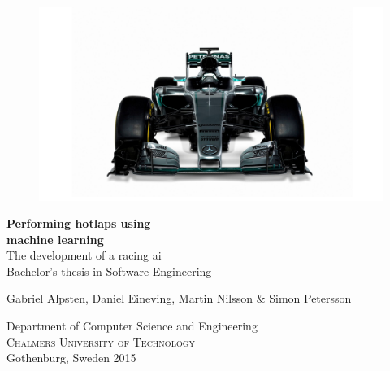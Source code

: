 \begin{titlepage}
			
\addtolength{\voffset}{2cm}

\begin{figure}[H]
\centering
\vspace{1cm}	%
\includegraphics[width=0.9\linewidth]{report/images/logo.jpg}
\end{figure}
\setlength{\parindent}{0ex}
\mbox{}
\vfill
\renewcommand{\familydefault}{\sfdefault} \normalfont %


\textbf{{\Huge Performing hotlaps using \\ machine learning}} 	\\[0.5cm]
{\Large The development of a racing ai}\\[0.5cm]
Bachelor's thesis in Software Engineering \setlength{\parskip}{1cm}

{\large Gabriel Alpsten, Daniel Eineving, Martin Nilsson \& Simon Petersson} \setlength{\parskip}{2.9cm}

Department of Computer Science and Engineering \\
\textsc{Chalmers University of Technology} \\
Gothenburg, Sweden 2015

\renewcommand{\familydefault}{\rmdefault} \normalfont %
\end{titlepage}


\newpage
\restoregeometry
\thispagestyle{empty}
\mbox{}


